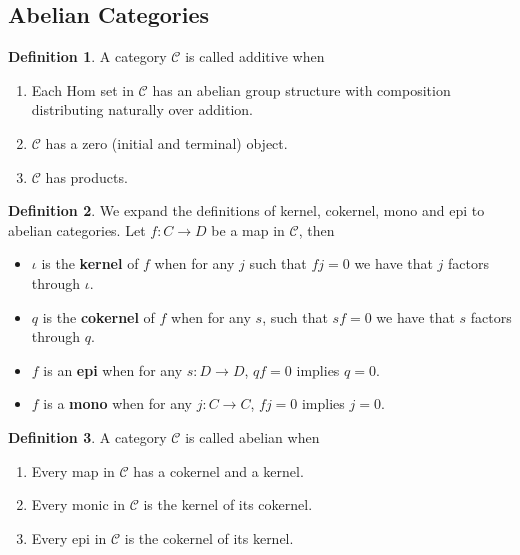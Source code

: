 \documentclass[11pt]{article}
\theoremstyle{definition}
\newtheorem{defn}{Definition}
\begin{document}
    \subsection{Abelian Categories}

    \begin{defn}
        A category \(\mathcal{C}\) is called additive when
        \begin{enumerate}
            \item Each Hom set in \(\mathcal{C}\) has an abelian group structure with composition distributing naturally over addition.
            \item \(\mathcal{C}\) has a zero (initial and terminal) object.
            \item \(\mathcal{C}\) has products.
        \end{enumerate}
    \end{defn}
    \begin{defn}
        We expand the definitions of kernel, cokernel, mono and epi to abelian categories. Let \(f: C \to D\) be a map in \(\mathcal{C}\), then
        \begin{itemize}
            \item \(\iota\) is the \textbf{kernel} of \(f\) when for any \(j\) such that \(fj = 0\) we have that \(j\) factors through \(\iota\).
            \item \(q\) is the \textbf{cokernel} of \(f\) when for any \(s\), such that \(sf = 0\) we have that \(s\) factors through \(q\).
            \item \(f\) is an \textbf{epi} when for any \(s: D \to D\), \(qf = 0\) implies \(q = 0\).
            \item \(f\) is a \textbf{mono} when for any \(j: C \to C\), \(fj = 0\) implies \(j = 0\).
        \end{itemize}
    \end{defn}
    \begin{defn}
        A category \(\mathcal{C}\) is called abelian when
        \begin{enumerate}
            \item Every map in \(\mathcal{C}\) has a cokernel and a kernel.
            \item Every monic in \(\mathcal{C}\) is the kernel of its cokernel.
            \item Every epi in \(\mathcal{C}\) is the cokernel of its kernel.
        \end{enumerate}
    \end{defn}
\end{document}
